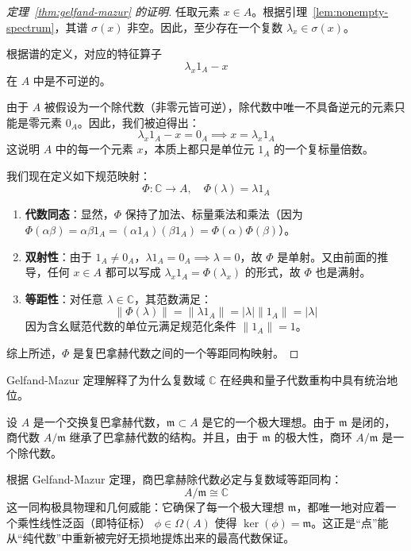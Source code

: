 \documentclass[10pt,a4paper]{article}
\numberwithin{equation}{section}
\begin{document}
\begin{proof}[定理~\ref{thm:gelfand-mazur} 的证明]
任取元素 $x \in A$。根据引理~\ref{lem:nonempty-spectrum}，其谱 $\sigma(x)$ 非空。因此，至少存在一个复数 $\lambda_x \in \sigma(x)$。

根据谱的定义，对应的特征算子
\begin{equation}
\lambda_x 1_A - x
\end{equation}
在 $A$ 中是不可逆的。

由于 $A$ 被假设为一个除代数（非零元皆可逆），除代数中唯一不具备逆元的元素只能是零元素 $0_A$。因此，我们被迫得出：
\begin{equation}
\lambda_x 1_A - x = 0_A \implies x = \lambda_x 1_A
\end{equation}
这说明 $A$ 中的每一个元素 $x$，本质上都只是单位元 $1_A$ 的一个复标量倍数。

我们现在定义如下规范映射：
\begin{equation}
\Phi: \mathbb{C} \to A, \quad \Phi(\lambda) = \lambda 1_A
\end{equation}
\begin{enumerate}[label=(\roman*)]
  \item \textbf{代数同态}：显然，$\Phi$ 保持了加法、标量乘法和乘法（因为 $\Phi(\alpha\beta) = \alpha\beta 1_A = (\alpha 1_A)(\beta 1_A) = \Phi(\alpha)\Phi(\beta)$）。
  \item \textbf{双射性}：由于 $1_A \neq 0_A$，$\lambda 1_A = 0_A \implies \lambda = 0$，故 $\Phi$ 是单射。又由前面的推导，任何 $x \in A$ 都可以写成 $\lambda_x 1_A = \Phi(\lambda_x)$ 的形式，故 $\Phi$ 也是满射。
  \item \textbf{等距性}：对任意 $\lambda \in \mathbb{C}$，其范数满足：
  \begin{equation}
  \|\Phi(\lambda)\| = \|\lambda 1_A\| = |\lambda| \|1_A\| = |\lambda|
  \end{equation}
  因为含幺赋范代数的单位元满足规范化条件 $\|1_A\| = 1$。
\end{enumerate}
综上所述，$\Phi$ 是复巴拿赫代数之间的一个等距同构映射。
\end{proof}

\begin{remark}[几何重构的本质]
Gelfand-Mazur 定理解释了为什么复数域 $\mathbb{C}$ 在经典和量子代数重构中具有统治地位。

设 $A$ 是一个交换复巴拿赫代数，$\mathfrak{m} \subset A$ 是它的一个极大理想。由于 $\mathfrak{m}$ 是闭的，商代数 $A/\mathfrak{m}$ 继承了巴拿赫代数的结构。并且，由于 $\mathfrak{m}$ 的极大性，商环 $A/\mathfrak{m}$ 是一个除代数。

根据 Gelfand-Mazur 定理，商巴拿赫除代数必定与复数域等距同构：
\begin{equation}
A/\mathfrak{m} \cong \mathbb{C}
\end{equation}
这一同构极具物理和几何威能：它确保了每一个极大理想 $\mathfrak{m}$，都唯一地对应着一个乘性线性泛函（即特征标） $\phi \in \Omega(A)$ 使得 $\ker(\phi) = \mathfrak{m}$。这正是“点”能从“纯代数”中重新被完好无损地提炼出来的最高代数保证。
\end{remark}
\end{document}
